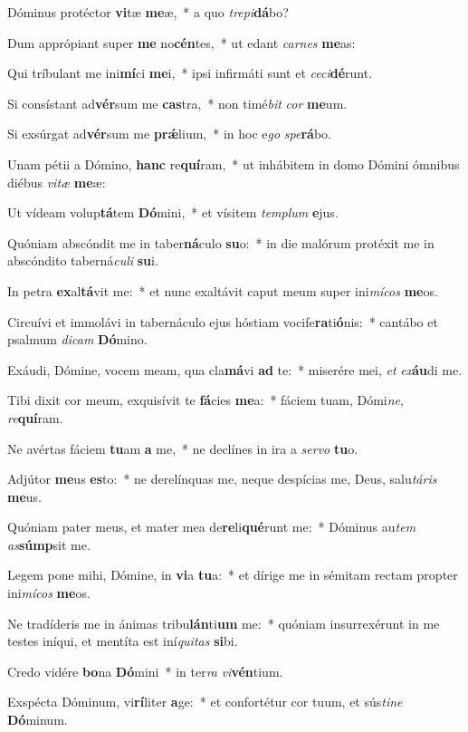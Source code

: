 \item Dóminus protéctor \textbf{vi}tæ \textbf{me}æ,~* a quo \textit{tre}\textit{pi}\textbf{dá}bo?
\item Dum apprópiant super \textbf{me} no\textbf{cén}tes,~* ut edant \textit{car}\textit{nes} \textbf{me}as:
\item Qui tríbulant me ini\textbf{mí}ci \textbf{me}i,~* ipsi infirmáti sunt et \textit{ce}\textit{ci}\textbf{dé}runt.
\item Si consístant ad\textbf{vér}sum me \textbf{cas}tra,~* non timé\textit{bit} \textit{cor} \textbf{me}um.
\item Si exsúrgat ad\textbf{vér}sum me \textbf{prǽ}lium,~* in hoc e\textit{go} \textit{spe}\textbf{rá}bo.
\item Unam pétii a Dómino, \textbf{hanc} re\textbf{quí}ram,~* ut inhábitem in domo Dómini ómnibus diébus \textit{vi}\textit{tæ} \textbf{me}æ:
\item Ut vídeam volup\textbf{tá}tem \textbf{Dó}mini,~* et vísitem \textit{tem}\textit{plum} \textbf{e}jus.
\item Quóniam abscóndit me in taber\textbf{ná}culo \textbf{su}o:~* in die malórum protéxit me in abscóndito taberná\textit{cu}\textit{li} \textbf{su}i.
\item In petra \textbf{ex}al\textbf{tá}vit me:~* et nunc exaltávit caput meum super ini\textit{mí}\textit{cos} \textbf{me}os.
\item Circuívi et immolávi in tabernáculo ejus hóstiam vocife\textbf{ra}ti\textbf{ó}nis:~* cantábo et psalmum \textit{di}\textit{cam} \textbf{Dó}mino.
\item Exáudi, Dómine, vocem meam, qua cla\textbf{má}vi \textbf{ad} te:~* miserére mei, \textit{et} \textit{ex}\textbf{áu}di me.
\item Tibi dixit cor meum, exquisívit te \textbf{fá}cies \textbf{me}a:~* fáciem tuam, Dómi\textit{ne}, \textit{re}\textbf{quí}ram.
\item Ne avértas fáciem \textbf{tu}am \textbf{a} me,~* ne declínes in ira a \textit{ser}\textit{vo} \textbf{tu}o.
\item Adjútor \textbf{me}us \textbf{es}to:~* ne derelínquas me, neque despícias me, Deus, salu\textit{tá}\textit{ris} \textbf{me}us.
\item Quóniam pater meus, et mater mea de\textbf{re}li\textbf{qué}runt me:~* Dóminus au\textit{tem} \textit{as}\textbf{súmp}sit me.
\item Legem pone mihi, Dómine, in \textbf{vi}a \textbf{tu}a:~* et dírige me in sémitam rectam propter ini\textit{mí}\textit{cos} \textbf{me}os.
\item Ne tradíderis me in ánimas tribu\textbf{lán}ti\textbf{um} me:~* quóniam insurrexérunt in me testes iníqui, et mentíta est iní\textit{qui}\textit{tas} \textbf{si}bi.
\item Credo vidére \textbf{bo}na \textbf{Dó}mini~* in ter\textit{ra} \textit{vi}\textbf{vén}tium.
\item Exspécta Dóminum, vi\textbf{rí}liter \textbf{a}ge:~* et confortétur cor tuum, et sús\textit{ti}\textit{ne} \textbf{Dó}minum.
